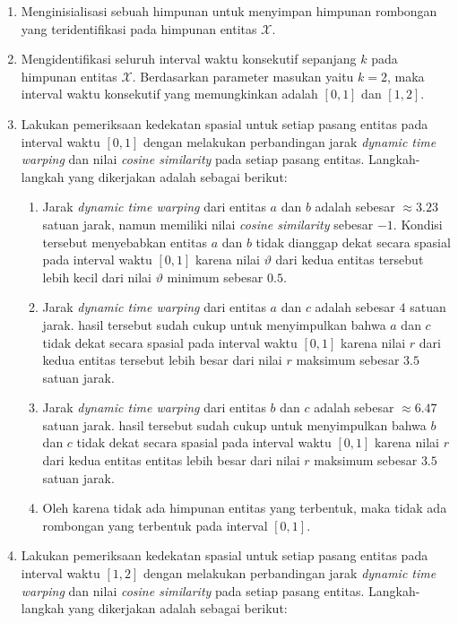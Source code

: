 \begin{enumerate}
    \item Menginisialisasi sebuah himpunan untuk menyimpan himpunan rombongan yang teridentifikasi pada himpunan entitas $\mathcal{X}$.
    \item Mengidentifikasi seluruh interval waktu konsekutif sepanjang $k$ pada himpunan entitas $\mathcal{X}$. Berdasarkan parameter masukan yaitu $k = 2$, maka interval waktu konsekutif yang memungkinkan adalah $[0, 1]$ dan $[1, 2]$.
    \item Lakukan pemeriksaan kedekatan spasial untuk setiap pasang entitas pada interval waktu $[0, 1]$ dengan melakukan perbandingan jarak \textit{dynamic time warping} dan nilai \textit{cosine similarity} pada setiap pasang entitas. Langkah-langkah yang dikerjakan adalah sebagai berikut: 
    
    \begin{enumerate}
        \item Jarak \textit{dynamic time warping} dari entitas $a$ dan $b$ adalah sebesar $\approx 3.23$ satuan jarak, namun memiliki nilai \textit{cosine similarity} sebesar $-1$. Kondisi tersebut menyebabkan entitas $a$ dan $b$ tidak dianggap dekat secara spasial pada interval waktu $[0, 1]$ karena nilai $\vartheta$ dari kedua entitas tersebut lebih kecil dari nilai $\vartheta$ minimum sebesar $0.5$.
        \item Jarak \textit{dynamic time warping} dari entitas $a$ dan $c$ adalah sebesar $4$ satuan jarak. hasil tersebut sudah cukup untuk menyimpulkan bahwa $a$ dan $c$ tidak dekat secara spasial pada interval waktu $[0, 1]$ karena nilai $r$ dari kedua entitas tersebut lebih besar dari nilai $r$ maksimum sebesar $3.5$ satuan jarak.
        \item Jarak \textit{dynamic time warping} dari entitas $b$ dan $c$ adalah sebesar $\approx 6.47$ satuan jarak. hasil tersebut sudah cukup untuk menyimpulkan bahwa $b$ dan $c$ tidak dekat secara spasial pada interval waktu $[0, 1]$ karena nilai $r$ dari kedua entitas entitas lebih besar dari nilai $r$ maksimum sebesar $3.5$ satuan jarak.
        \item Oleh karena tidak ada himpunan entitas yang terbentuk, maka tidak ada rombongan yang terbentuk pada interval $[0, 1]$.
    \end{enumerate}
    
    \item Lakukan pemeriksaan kedekatan spasial untuk setiap pasang entitas pada interval waktu $[1, 2]$ dengan melakukan perbandingan jarak \textit{dynamic time warping} dan nilai \textit{cosine similarity} pada setiap pasang entitas. Langkah-langkah yang dikerjakan adalah sebagai berikut: 
    

\end{enumerate}
